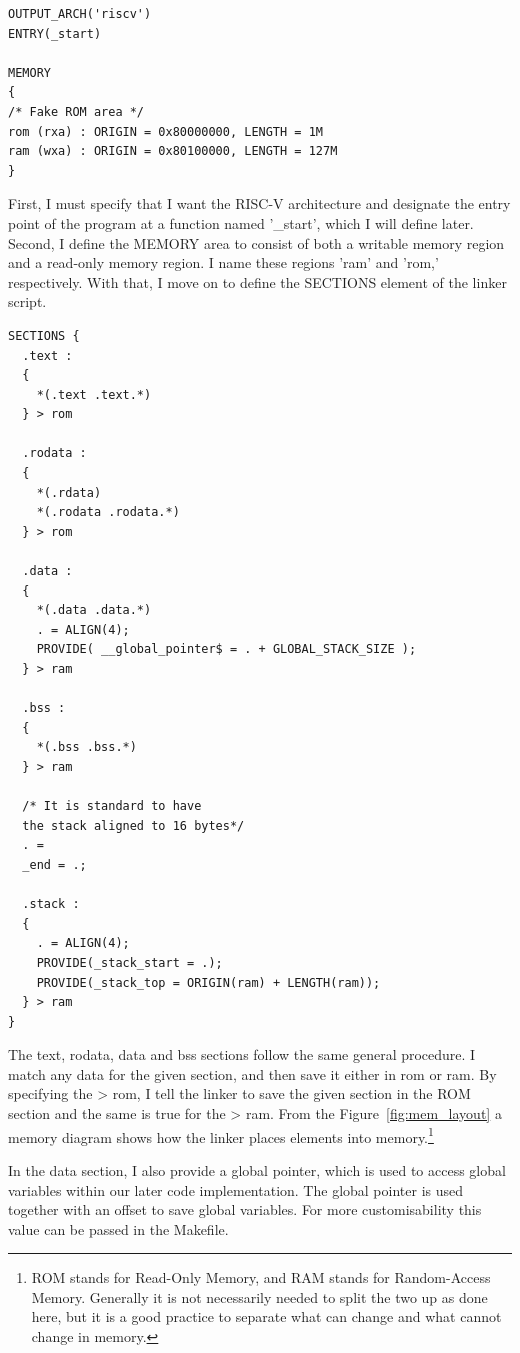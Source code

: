 \begin{lstlisting}[caption=Memory area defined in linker script]
OUTPUT_ARCH('riscv')
ENTRY(_start)

MEMORY
{
/* Fake ROM area */
rom (rxa) : ORIGIN = 0x80000000, LENGTH = 1M
ram (wxa) : ORIGIN = 0x80100000, LENGTH = 127M
}
\end{lstlisting}
First, I must specify that I want the RISC-V architecture and designate the
entry point of the program at a function named '\_start', which I will define
later. Second, I define the MEMORY area to consist of both a writable memory
region and a read-only memory region. I name these regions 'ram' and 'rom,'
respectively. With that, I move on to define the SECTIONS element of the linker
script.

\begin{lstlisting}[caption=Linker scripts SECTIONS.]
SECTIONS {
  .text :
  {
    *(.text .text.*)
  } > rom

  .rodata :
  {
    *(.rdata)
    *(.rodata .rodata.*)
  } > rom

  .data :
  {
    *(.data .data.*)
    . = ALIGN(4);
    PROVIDE( __global_pointer$ = . + GLOBAL_STACK_SIZE );
  } > ram

  .bss :
  {
    *(.bss .bss.*)
  } > ram

  /* It is standard to have
  the stack aligned to 16 bytes*/
  . =
  _end = .;

  .stack :
  {
    . = ALIGN(4);
    PROVIDE(_stack_start = .);
    PROVIDE(_stack_top = ORIGIN(ram) + LENGTH(ram));
  } > ram
}
\end{lstlisting}
The text, rodata, data and bss sections follow the same general procedure. I
match any data for the given section, and then save it either in rom or ram. By
specifying the > rom, I tell the linker to save the given section in the ROM
section and the same is true for the > ram. From the Figure~\ref{fig:mem_layout}
a memory diagram shows how the linker places elements into memory.\footnote{ROM
  stands for Read-Only Memory, and RAM stands for Random-Access Memory.
  Generally it is not necessarily needed to split the two up as done here, but
it is a good practice to separate what can change and what cannot change in
memory.}

In the data section, I also provide a global pointer, which is used to access
global variables within our later code implementation. The global pointer is
used together with an offset to save global variables. For more customisability
this value can be passed in the Makefile.

